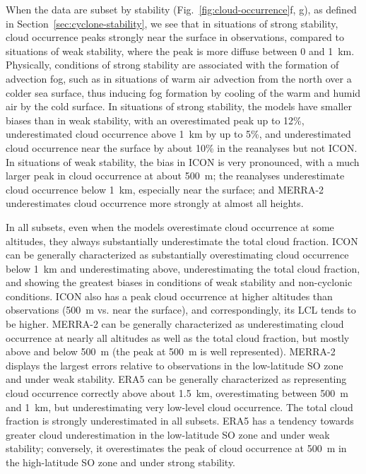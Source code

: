 \documentclass[draft]{agujournal2019}
\begin{document}
When the data are subset by stability (Fig.~\ref{fig:cloud-occurrence}f, g), as defined in Section~\ref{sec:cyclone-stability}, we see that in situations of strong stability, cloud occurrence peaks strongly near the surface in observations, compared to situations of weak stability, where the peak is more diffuse between 0 and 1~km. Physically, conditions of strong stability are associated with the formation of advection fog, such as in situations of warm air advection from the north over a colder sea surface, thus inducing fog formation by cooling of the warm and humid air by the cold surface. In situations of strong stability, the models have smaller biases than in weak stability, with an overestimated peak up to 12\%, underestimated cloud occurrence above 1~km by up to 5\%, and underestimated cloud occurrence near the surface by about 10\% in the reanalyses but not ICON. In situations of weak stability, the bias in ICON is very pronounced, with a much larger peak in cloud occurrence at about 500~m; the reanalyses underestimate cloud occurrence below 1~km, especially near the surface; and MERRA-2 underestimates cloud occurrence more strongly at almost all heights.

In all subsets, even when the models overestimate cloud occurrence at some altitudes, they always substantially underestimate the total cloud fraction. ICON can be generally characterized as substantially overestimating cloud occurrence below 1~km and underestimating above, underestimating the total cloud fraction, and showing the greatest biases in conditions of weak stability and non-cyclonic conditions. ICON also has a peak cloud occurrence at higher altitudes than observations (500~m vs. near the surface), and correspondingly, its LCL tends to be higher. MERRA-2 can be generally characterized as underestimating cloud occurrence at nearly all altitudes as well as the total cloud fraction, but mostly above and below 500~m (the peak at 500~m is well represented). MERRA-2 displays the largest errors relative to observations in the low-latitude SO zone and under weak stability. ERA5 can be generally characterized as representing cloud occurrence correctly above about 1.5~km, overestimating between 500~m and 1~km, but underestimating very low-level cloud occurrence. The total cloud fraction is strongly underestimated in all subsets. ERA5 has a tendency towards greater cloud underestimation in the low-latitude SO zone and under weak stability; conversely, it overestimates the peak of cloud occurrence at 500~m in the high-latitude SO zone and under strong stability.
\end{document}
